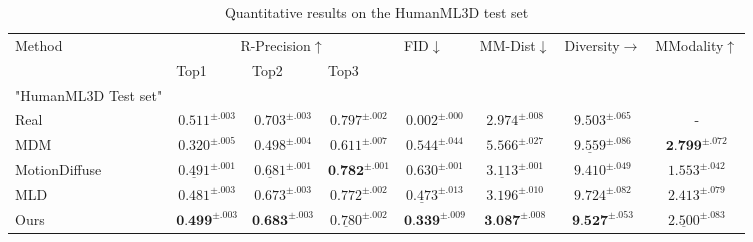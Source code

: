 \documentclass[a4paper, 12pt]{article}
\begin{document}
\begin{table}
  \caption{Quantitative results on the HumanML3D  test set}
  \label{tab1}
\begin{adjustbox}{width=1\textwidth}
\begin{tabular}{lccccccc}
\toprule
\multirow{2}{*}{Method} & \multicolumn{3}{c}{R-Precision$\uparrow$}                                                & \multicolumn{1}{l}{\multirow{2}{*}{FID$\downarrow$}} & \multicolumn{1}{l}{\multirow{2}{*}{MM-Dist$\downarrow$}} & \multicolumn{1}{l}{\multirow{2}{*}{Diversity$\rightarrow$}} & \multicolumn{1}{l}{\multirow{2}{*}{ MModality$\uparrow$}} \\ 
                        & \multicolumn{1}{l}{Top1} & \multicolumn{1}{l}{Top2} & \multicolumn{1}{l}{Top3} & \multicolumn{1}{l}{}                     & \multicolumn{1}{l}{}                         & \multicolumn{1}{l}{}                           & \multicolumn{1}{l}{}                           \\ \midrule
"HumanML3D Test set" \\
\midrule
Real & $0.511^{\pm.003}$ & $0.703^{\pm.003}$ & $0.797^{\pm.002}$ & $0.002^{\pm.000}$ & $2.974^{\pm.008}$  & $9.503^{\pm.065}$ & - \\ \hdashline
\rule{0pt}{10pt}MDM \cite{tevet2022human}  & $0.320^{\pm.005}$  & $0.498^{\pm.004}$ & $0.611^{\pm.007}$  & $0.544^{\pm.044}$  & $5.566^{\pm.027}$  & $\underline{9.559}^{\pm.086}$  & $\textbf{2.799}^{\pm.072}$                                          \\
MotionDiffuse \cite{zhang2024motiondiffuse}           & $\underline{0.491}^{\pm.001}$                    & $\underline{0.681}^{\pm.001}$                    & $\textbf{0.782}^{\pm.001}$                    & $0.630^{\pm.001}$                                    & $\underline{3.113}^{\pm.001}$                                        & $9.410^{\pm.049}$                                          & $1.553^{\pm.042}$                                          \\
MLD \cite{chen2023executing}                     & $0.481^{\pm.003}$                    & $0.673^{\pm.003}$                    & $0.772^{\pm.002}$                    & $\underline{0.473}^{\pm.013}$                                    & $3.196^{\pm.010}$                                        & $9.724^{\pm.082}$                                          & $2.413^{\pm.079}$                                          \\
Ours                    & $\textbf{0.499}^{\pm.003}$                  & $\textbf{0.683}^{\pm.003}$                   & $\underline{0.780}^{\pm.002}$                    & $\textbf{0.339}^{\pm.009}$                                    & $\textbf{3.087}^{\pm.008}$                                        & $\textbf{9.527}^{\pm.053}$                                          & $\underline{2.500}^{\pm.083}$                                          \\ 
\midrule

\end{tabular}
\end{adjustbox}
\end{table}
\end{document}
